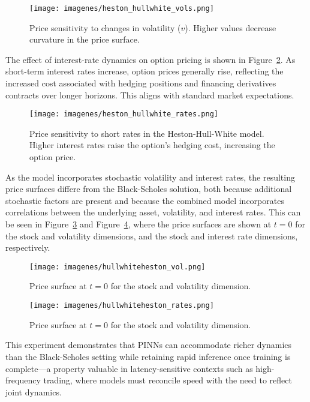\documentclass[12pt]{report} %
\theoremstyle{plain}           %
\theoremstyle{definition}      %
\theoremstyle{remark}          %
\begin{document}
\begin{figure}[H]
	\centering
	\texttt{[image: imagenes/heston\_hullwhite\_vols.png]}
	\caption{Price sensitivity to changes in volatility ($v$). Higher 
	values decrease curvature in the price surface.}
	\label{fig:heston_hullwhite_vols}
\end{figure}

The effect of interest-rate dynamics on option pricing is shown in 
Figure~\ref{fig:heston_hullwhite_rates}. As short-term interest 
rates increase, option prices generally rise, reflecting the increased cost 
associated with hedging positions and financing derivatives contracts over 
longer horizons. This aligns with standard market expectations.

\begin{figure}[H]
	\centering
	\texttt{[image: imagenes/heston\_hullwhite\_rates.png]}
	\caption{Price sensitivity to short rates in the Heston-Hull-White model. Higher interest rates raise the option's hedging cost, increasing the option price.}
	\label{fig:heston_hullwhite_rates}
\end{figure}

As the model incorporates stochastic volatility and interest rates, the resulting price surfaces differe from the Black-Scholes solution,
both because additional stochastic factors are present and because the combined model incorporates correlations between the underlying asset, volatility, and interest rates.
This can be seen in Figure~\ref{fig:hullwhiteheston_surface_vol} and Figure~\ref{fig:hullwhiteheston_surface_rates}, where the price
surfaces are shown at $t=0$ for the stock and volatility dimensions, and the stock and interest rate dimensions, respectively.

\begin{figure}[H]
	\centering
	\texttt{[image: imagenes/hullwhiteheston\_vol.png]}
	\caption{Price surface at $t=0$ for the stock and volatility dimension.}
	\label{fig:hullwhiteheston_surface_vol}
\end{figure}

\begin{figure}[H]
	\centering
	\texttt{[image: imagenes/hullwhiteheston\_rates.png]}
	\caption{Price surface at $t=0$ for the stock and volatility dimension.}
	\label{fig:hullwhiteheston_surface_rates}
\end{figure}

This experiment demonstrates that PINNs can accommodate richer dynamics than the Black-Scholes 
setting while retaining rapid inference once training is complete—a property valuable in 
latency-sensitive contexts such as high-frequency trading, where models must reconcile speed 
with the need to reflect joint dynamics.
\end{document}
